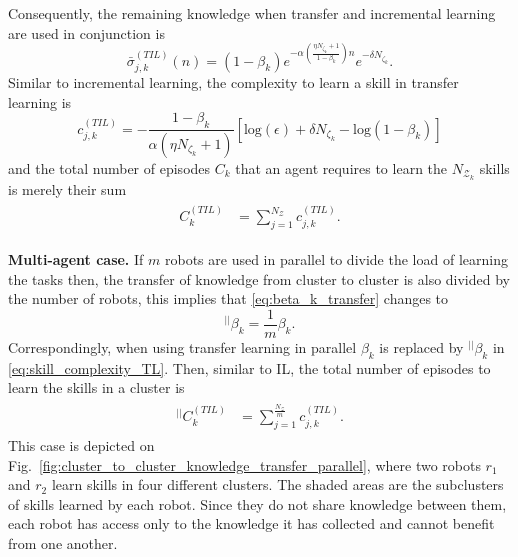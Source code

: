 Consequently, the remaining knowledge when transfer and incremental learning are used in conjunction is
\begin{equation}\label{eq:remaining_knowledge__ITL}
	\bar{\sigma}^{(TIL)}_{j,k}(n) = \left(1- \beta_k\right) e^{-\alpha  \left(\frac{ \eta N_{\zeta_k}+1}{1 - \beta_k}\right) n} e^{-\delta N_{\zeta_k}}.
\end{equation}
Similar to incremental learning, the complexity to learn a skill in transfer learning is
\begin{equation}\label{eq:skill_complexity_TL}
	c^{(TIL)}_{j,k} = -\frac{1 - \beta_{k}}{\alpha (\eta N_{\zeta_k}+ 1)}\left[\text{log}(\epsilon) + \delta N_{\zeta_k} - \text{log}(1 - \beta_{k})\right]
\end{equation}
and the total number of episodes  $ C_k $ that an agent requires to learn the $N_{\mathcal{Z}_k}$ skills is merely their sum
\begin{align}\label{eq:total_episodes_transfer}
	\begin{split}
		C^{(TIL)}_k &= \sum^{N_{\mathcal{Z}}}_{j=1} c^{(TIL)}_{j,k}.
	\end{split}
\end{align}

\textbf{Multi-agent case.} If $m$ robots are used in parallel to divide the load of learning the tasks then, the transfer of knowledge from cluster to cluster is also divided by the number of robots, this implies that \eqref{eq:beta_k_transfer} changes to
\begin{equation}\label{eq:beta_k_transfer_parallel}
	{}^{\lvert \rvert}\beta_{k}= \frac{1}{m}\beta_{k}.
\end{equation}
Correspondingly, when using transfer learning in parallel $\beta_k$ is replaced by ${}^{\lvert \rvert}\beta_{k}$ in \eqref{eq:skill_complexity_TL}. Then, similar to IL, the total number of episodes to learn the skills in a cluster is
\begin{align}
	\begin{split}
		{}^{\lvert \rvert}C^{(TIL)}_k &= \sum^{\frac{N_{\mathcal{Z}}}{m}}_{j=1} c^{(TIL)}_{j,k}.
	\end{split}
\end{align}
This case is depicted on Fig.~\ref{fig:cluster_to_cluster_knowledge_transfer_parallel}, where two robots $ r_1$ and $r_2$ learn skills in four different clusters. The shaded areas are the subclusters of skills learned by each robot. Since they do not share knowledge between them, each robot has access only to the knowledge it has collected and cannot benefit from one another. 

